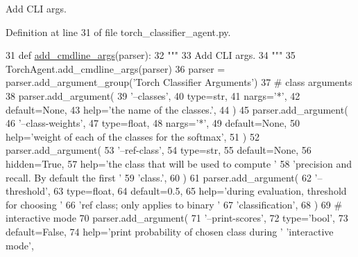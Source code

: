 \begin{DoxyVerb}Add CLI args.
\end{DoxyVerb}
 

Definition at line 31 of file torch\+\_\+classifier\+\_\+agent.\+py.


\begin{DoxyCode}
31     \textcolor{keyword}{def }\hyperlink{namespaceparlai_1_1agents_1_1drqa_1_1config_a62fdd5554f1da6be0cba185271058320}{add\_cmdline\_args}(parser):
32         \textcolor{stringliteral}{"""}
33 \textcolor{stringliteral}{        Add CLI args.}
34 \textcolor{stringliteral}{        """}
35         TorchAgent.add\_cmdline\_args(parser)
36         parser = parser.add\_argument\_group(\textcolor{stringliteral}{'Torch Classifier Arguments'})
37         \textcolor{comment}{# class arguments}
38         parser.add\_argument(
39             \textcolor{stringliteral}{'--classes'},
40             type=str,
41             nargs=\textcolor{stringliteral}{'*'},
42             default=\textcolor{keywordtype}{None},
43             help=\textcolor{stringliteral}{'the name of the classes.'},
44         )
45         parser.add\_argument(
46             \textcolor{stringliteral}{'--class-weights'},
47             type=float,
48             nargs=\textcolor{stringliteral}{'*'},
49             default=\textcolor{keywordtype}{None},
50             help=\textcolor{stringliteral}{'weight of each of the classes for the softmax'},
51         )
52         parser.add\_argument(
53             \textcolor{stringliteral}{'--ref-class'},
54             type=str,
55             default=\textcolor{keywordtype}{None},
56             hidden=\textcolor{keyword}{True},
57             help=\textcolor{stringliteral}{'the class that will be used to compute '}
58             \textcolor{stringliteral}{'precision and recall. By default the first '}
59             \textcolor{stringliteral}{'class.'},
60         )
61         parser.add\_argument(
62             \textcolor{stringliteral}{'--threshold'},
63             type=float,
64             default=0.5,
65             help=\textcolor{stringliteral}{'during evaluation, threshold for choosing '}
66             \textcolor{stringliteral}{'ref class; only applies to binary '}
67             \textcolor{stringliteral}{'classification'},
68         )
69         \textcolor{comment}{# interactive mode}
70         parser.add\_argument(
71             \textcolor{stringliteral}{'--print-scores'},
72             type=\textcolor{stringliteral}{'bool'},
73             default=\textcolor{keyword}{False},
74             help=\textcolor{stringliteral}{'print probability of chosen class during '} \textcolor{stringliteral}{'interactive mode'},

\end{DoxyCode}
